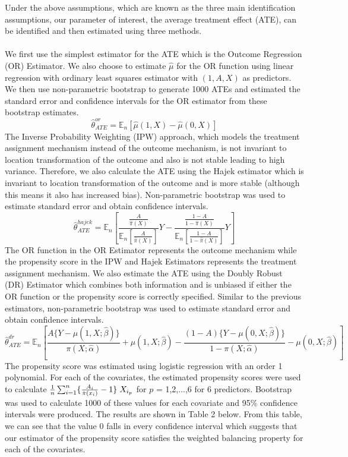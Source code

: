\documentclass{article}
\newcommand{\E}{\mathbb{E}}
\begin{document}
Under the above assumptions, which are known as the three main identification assumptions, our parameter of interest, the average treatment effect (ATE), can be identified and then estimated using three methods.\\
\\
We first use the simplest estimator for the ATE which is the Outcome Regression (OR) Estimator. We also choose to estimate $\hat{\mu}$ for the OR function using linear regression with ordinary least squares estimator with $(1, A, X)$ as predictors. We then use non-parametric bootstrap to generate 1000 ATEs and estimated the standard error and confidence intervals for the OR estimator from these bootstrap estimates.
\[
\hat{\theta}_{ATE}^{or} = \E_n[\hat{\mu}(1,X) - \hat{\mu}(0,X)]
\]
The Inverse Probability Weighting (IPW) approach, which models the treatment assignment mechanism instead of the outcome mechanism, is not invariant to location transformation of the outcome and also is not stable leading to high variance. Therefore, we also calculate the ATE using the Hajek estimator which is invariant to location transformation of the outcome and is more stable (although this means it also has increased bias). Non-parametric bootstrap was used to estimate standard error and obtain confidence intervals.
\[
\hat{\theta}_{ATE}^{hajek} = \E_n\left[\frac{\frac{A}{\hat{\pi}(X)}}{\E_n[\frac{A}{\hat{\pi}(X)}]}Y - \frac{\frac{1-A}{1-\hat{\pi}(X)}}{\E_n[\frac{1-A}{1-\hat{\pi}(X)}]}Y\right]
\]
The OR function in the OR Estimator represents the outcome mechanism while the propensity score in the IPW and Hajek Estimators represents the treatment assignment mechanism. We also estimate the ATE using the Doubly Robust (DR) Estimator which combines both information and is unbiased if either the OR function or the propensity score is correctly specified. Similar to the previous estimators, non-parametric bootstrap was used to estimate standard error and obtain confidence intervals.
\[
\hat{\theta}_{ATE}^{dr} = \E_n\left[\frac{A\{Y-\mu(1,X;\hat{\beta})\}}{\pi(X;\hat{\alpha})} + \mu(1,X;\hat{\beta}) - \frac{(1-A)\{Y-\mu(0,X;\hat{\beta})\}}{1-\pi(X;\hat{\alpha})} - \mu(0,X;\hat{\beta})\right]
\]
The propensity score was estimated using logistic regression with an order 1 polynomial. For each of the covariates, the estimated propensity scores were used to calculate $\frac{1}{n}\sum_{i=1}^{n}\{\frac{A_i}{\hat{\pi}(x_i)}-1\}\hspace{0.1cm}X_{i_{p}}$ for $p$ = 1,2,...,6 for 6 predictors. Bootstrap was used to calculate 1000 of these values for each covariate and 95\% confidence intervals were produced. The results are shown in Table 2 below. From this table, we can see that the value 0 falls in every confidence interval which suggests that our estimator of the propensity score satisfies the weighted balancing property for each of the covariates.
\end{document}

